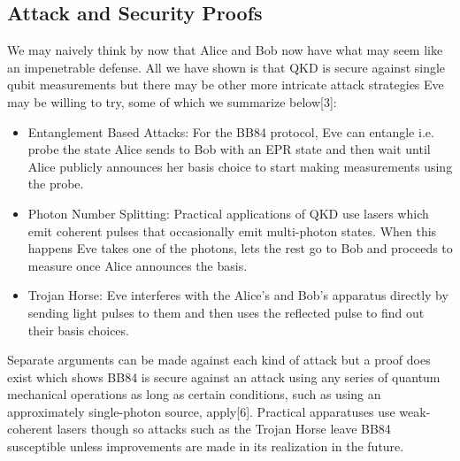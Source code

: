 \documentclass[aps,prd,final,twocolumn,letterpaper]{revtex4}
\begin{document}
\subsection{Attack and Security Proofs}
We may naively think by now that Alice and Bob now have what may seem like an impenetrable defense. All we have shown is that QKD is secure against single qubit measurements but there may be other more intricate attack strategies Eve may be willing to try, some of which we summarize below[3]:
\begin{itemize}
\item Entanglement Based Attacks: For the BB84 protocol, Eve can entangle i.e. probe the state Alice sends to Bob with an EPR state and then wait until Alice publicly announces her basis choice to start making measurements using the probe.
\item Photon Number Splitting: Practical applications of QKD use lasers which emit coherent pulses that occasionally emit multi-photon states. When this happens Eve takes one of the photons, lets the rest go to Bob and proceeds to measure once Alice announces the basis.
\item Trojan Horse: Eve interferes with the Alice's and Bob's apparatus directly by sending light pulses to them and then uses the reflected pulse to find out their basis choices.
\end{itemize}
Separate arguments can be made against each kind of attack but a proof does exist which shows BB84 is secure against an attack using any series of quantum mechanical operations as long as certain conditions, such as using an approximately single-photon source, apply[6]. Practical apparatuses use weak-coherent lasers though so attacks such as the Trojan Horse leave BB84 susceptible unless improvements are made in its realization in the future.
\end{document}
